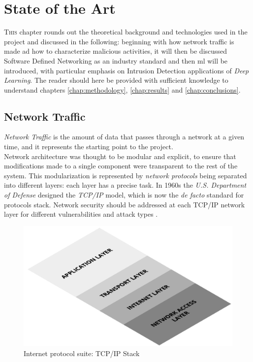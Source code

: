 \chapter{State of the Art}
\label{chap:state-of-the-art}

\lettrine[lines=3, findent=3pt, nindent=0pt]{T}{his} chapter rounds out the theoretical background and technologies used in the project and discussed in the following: beginning with how network traffic is made ad how to characterize malicious activities, it will then be discussed Software Defined Networking as an industry standard and then \gls{ml} will be introduced, with particular emphasis on Intrusion Detection applications of \textit{Deep Learning}. The reader should here be provided with sufficient knowledge to understand chapters \ref{chap:methodology}, \ref{chap:results} and \ref{chap:conclusions}.


\section{Network Traffic}
\label{sec:network-traffic}

\textit{Network Traffic} is the amount of data that passes through a network at a given time, and it represents the starting point to the project. \\ Network architecture was thought to be modular and explicit, to ensure that modifications made to a single component were transparent to the rest of the system. This modularization is represented by \textit{network protocols} being separated into different layers: each layer has a precise task. In 1960s the \textit{U.S. Department of Defense} designed the \textit{TCP/IP} model, which is now the \textit{de facto} standard for protocols stack. Network security should be addressed at each TCP/IP network layer for different vulnerabilities and attack types \cite{Zaman2009}.

\begin{figure}[h!]
    \centering
    \includegraphics[scale=0.23]{figures/TCP_IP Stack.png}
    \caption{Internet protocol suite: TCP/IP Stack}
    \label{fig:TCP/IP-stack}
\end{figure}

